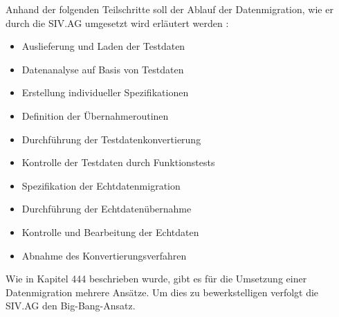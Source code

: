 Anhand der folgenden Teilschritte soll der Ablauf der Datenmigration, wie er durch die SIV.AG umgesetzt wird erläutert werden \cite{SIV11}:
\begin{itemize}
  \item Auslieferung und Laden der Testdaten
  \item Datenanalyse auf Basis von Testdaten
  \item Erstellung individueller Spezifikationen
  \item Definition der Übernahmeroutinen
  \item Durchführung der Testdatenkonvertierung
  \item Kontrolle der Testdaten durch Funktionstests
  \item Spezifikation der Echtdatenmigration
  \item Durchführung der Echtdatenübernahme
  \item Kontrolle und Bearbeitung der Echtdaten
  \item Abnahme des Konvertierungsverfahren
\end{itemize}

Wie in Kapitel 444 beschrieben wurde, gibt es für die Umsetzung einer Datenmigration mehrere Ansätze. Um dies zu bewerkstelligen verfolgt die SIV.AG den Big-Bang-Ansatz.

